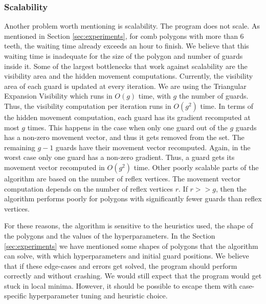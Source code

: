 \subsubsection*{Scalability}
Another problem worth mentioning is scalability. The program does not scale. As mentioned in Section \ref{sec:experiments}, for comb polygons with more than 6 teeth, the waiting time already exceeds an hour to finish. We believe that this waiting time is inadequate for the size of the polygon and number of guards inside it.
Some of the largest bottlenecks that work against scalability are the visibility area and the hidden movement computations. Currently, the visibility area of each guard is updated at every iteration. We are using the Triangular Expansion Visibility \cite{DBLP:journals/corr/BungiuHHHK14} which runs in $O(g)$ time, with $g$ the number of guards. Thus, the visibility computation per iteration runs in $O(g^2)$ time. 
In terms of the hidden movement computation, each guard has its gradient recomputed at most $g$ times. This happens in the case when only one guard out of the $g$ guards has a non-zero movement vector, and thus it gets removed from the set. The remaining $g - 1$ guards have their movement vector recomputed. Again, in the worst case only one guard has a non-zero gradient. Thus, a guard gets its movement vector recomputed in $O(g^2)$ time.
Other poorly scalable parts of the algorithm are based on the number of reflex vertices. The movement vector computation depends on the number of reflex vertices $r$. If $r >> g$, then the algorithm performs poorly for polygons with significantly fewer guards than reflex vertices.

For these reasons, the algorithm is sensitive to the heuristics used, the shape of the polygons and the values of the hyperparameters. In the Section \ref{sec:experiments} we have mentioned some shapes of polygons that the algorithm can solve, with which hyperparameters and initial guard positions.
We believe that if these edge-cases and errors get solved, the program should perform correctly and without crashing. We would still expect that the program would get stuck in local minima. However, it should be possible to escape them with case-specific hyperparameter tuning and heuristic choice.





